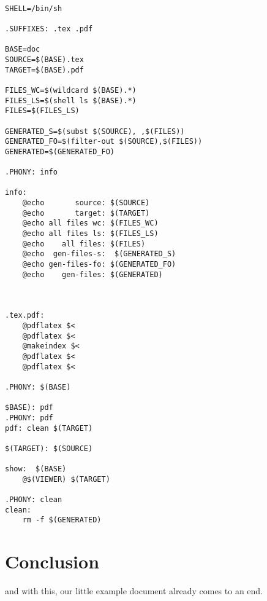 \documentclass{article}
\begin{document}
\lstset{language=[gnu] make}
\begin{lstlisting}

SHELL=/bin/sh

.SUFFIXES: .tex .pdf

BASE=doc
SOURCE=$(BASE).tex
TARGET=$(BASE).pdf

FILES_WC=$(wildcard $(BASE).*)
FILES_LS=$(shell ls $(BASE).*)
FILES=$(FILES_LS)

GENERATED_S=$(subst $(SOURCE), ,$(FILES))
GENERATED_FO=$(filter-out $(SOURCE),$(FILES))
GENERATED=$(GENERATED_FO)

.PHONY: info

info:
	@echo       source: $(SOURCE)
	@echo       target: $(TARGET)
	@echo all files wc: $(FILES_WC)
	@echo all files ls: $(FILES_LS)
	@echo    all files: $(FILES)
	@echo  gen-files-s:  $(GENERATED_S)
	@echo gen-files-fo: $(GENERATED_FO)
	@echo    gen-files: $(GENERATED)



.tex.pdf:
	@pdflatex $<
	@pdflatex $<
	@makeindex $<
	@pdflatex $<
	@pdflatex $<

.PHONY: $(BASE)
	
$BASE): pdf
.PHONY: pdf
pdf: clean $(TARGET)

$(TARGET): $(SOURCE)

show:  $(BASE)
	@$(VIEWER) $(TARGET)

.PHONY: clean
clean:
	rm -f $(GENERATED)

\end{lstlisting}






\section{Conclusion}

and with this, our little example document already comes to an end.



\printindex
{}
\end{document}
